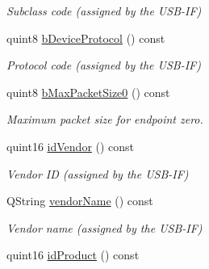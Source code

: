 \begin{DoxyCompactItemize}
\begin{DoxyCompactList}\small\item\em Subclass code (assigned by the USB-\/IF) \end{DoxyCompactList}\item 
\hypertarget{classmdt_usb_device_descriptor_aac1207bd8cb91e04f48f6748b1a8ca16}{
quint8 \hyperlink{classmdt_usb_device_descriptor_aac1207bd8cb91e04f48f6748b1a8ca16}{bDeviceProtocol} () const }
\label{classmdt_usb_device_descriptor_aac1207bd8cb91e04f48f6748b1a8ca16}

\begin{DoxyCompactList}\small\item\em Protocol code (assigned by the USB-\/IF) \end{DoxyCompactList}\item 
quint8 \hyperlink{classmdt_usb_device_descriptor_a08b5ae262e2b966c952ee5e5bcc6fb10}{bMaxPacketSize0} () const 
\begin{DoxyCompactList}\small\item\em Maximum packet size for endpoint zero. \end{DoxyCompactList}\item 
\hypertarget{classmdt_usb_device_descriptor_a8bbfdb3c54af6cccf15cd7e5f29e8a8e}{
quint16 \hyperlink{classmdt_usb_device_descriptor_a8bbfdb3c54af6cccf15cd7e5f29e8a8e}{idVendor} () const }
\label{classmdt_usb_device_descriptor_a8bbfdb3c54af6cccf15cd7e5f29e8a8e}

\begin{DoxyCompactList}\small\item\em Vendor ID (assigned by the USB-\/IF) \end{DoxyCompactList}\item 
QString \hyperlink{classmdt_usb_device_descriptor_ac2f746ebd5540b65bf00f82c991f5c3b}{vendorName} () const 
\begin{DoxyCompactList}\small\item\em Vendor name (assigned by the USB-\/IF) \end{DoxyCompactList}\item 
\hypertarget{classmdt_usb_device_descriptor_a722dad54d42f03470508115f6394b9a1}{
quint16 \hyperlink{classmdt_usb_device_descriptor_a722dad54d42f03470508115f6394b9a1}{idProduct} () const }
\label{classmdt_usb_device_descriptor_a722dad54d42f03470508115f6394b9a1}


\end{DoxyCompactItemize}
